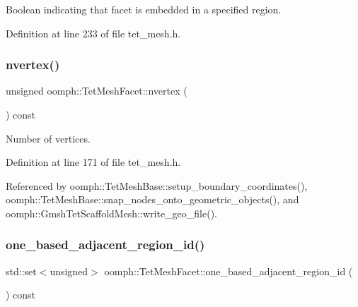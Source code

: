 Boolean indicating that facet is embedded in a specified region. 



Definition at line 233 of file tet\+\_\+mesh.\+h.

\mbox{\label{classoomph_1_1TetMeshFacet_aa6f08ddc938cd6a52f601c63831148ea}} 
\subsubsection{\texorpdfstring{nvertex()}{nvertex()}}
{\footnotesize\ttfamily unsigned oomph\+::\+Tet\+Mesh\+Facet\+::nvertex (\begin{DoxyParamCaption}{ }\end{DoxyParamCaption}) const\hspace{0.3cm}{\ttfamily [inline]}}



Number of vertices. 



Definition at line 171 of file tet\+\_\+mesh.\+h.



Referenced by oomph\+::\+Tet\+Mesh\+Base\+::setup\+\_\+boundary\+\_\+coordinates(), oomph\+::\+Tet\+Mesh\+Base\+::snap\+\_\+nodes\+\_\+onto\+\_\+geometric\+\_\+objects(), and oomph\+::\+Gmsh\+Tet\+Scaffold\+Mesh\+::write\+\_\+geo\+\_\+file().

\mbox{\label{classoomph_1_1TetMeshFacet_acd88930abc1356702d60841b0e8224e9}} 
\subsubsection{\texorpdfstring{one\+\_\+based\+\_\+adjacent\+\_\+region\+\_\+id()}{one\_based\_adjacent\_region\_id()}}
{\footnotesize\ttfamily std\+::set$<$unsigned$>$ oomph\+::\+Tet\+Mesh\+Facet\+::one\+\_\+based\+\_\+adjacent\+\_\+region\+\_\+id (\begin{DoxyParamCaption}{ }\end{DoxyParamCaption}) const\hspace{0.3cm}{\ttfamily [inline]}}



